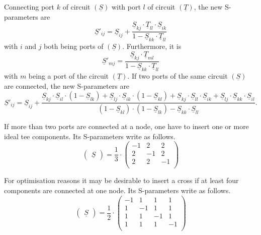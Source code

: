 Connecting port $k$ of circuit $(\underline{S})$ with port $l$ of
circuit $(\underline{T})$, the new S-parameters are
\begin{equation}
\underline{S}'_{ij} = \underline{S}_{ij} +
      \frac{\underline{S}_{kj}\cdot \underline{T}_{ll}\cdot \underline{S}_{ik}}
           {1-\underline{S}_{kk}\cdot \underline{T}_{ll}}
\label{eq:connectSij}
\end{equation}
with $i$ and $j$ both being ports of $(\underline{S})$.  Furthermore, it is
\begin{equation}
\underline{S}'_{mj} =
      \frac{\underline{S}_{kj}\cdot \underline{T}_{ml}}
           {1-\underline{S}_{kk}\cdot \underline{T}_{ll}}
\label{eq:connectSmj}
\end{equation}
with $m$ being a port of the circuit $(\underline{T})$.  If two ports
of the same circuit $(\underline{S})$ are connected, the new
S-parameters are
\begin{equation}
\underline{S}'_{ij} = \underline{S}_{ij} +
      \frac{ \underline{S}_{kj}\cdot \underline{S}_{il}\cdot (1-\underline{S}_{lk})
           + \underline{S}_{lj}\cdot \underline{S}_{ik}\cdot (1-\underline{S}_{kl})
           + \underline{S}_{kj}\cdot \underline{S}_{ll}\cdot \underline{S}_{ik}
           + \underline{S}_{lj}\cdot \underline{S}_{kk}\cdot \underline{S}_{il}}
           {(1-\underline{S}_{kl})\cdot (1-\underline{S}_{lk}) - \underline{S}_{kk}\cdot \underline{S}_{ll}}.
\label{eq:iconnectSij}
\end{equation}

If more than two ports are connected at a node, one have to insert one
or more ideal tee components.  Its S-parameters write as follows.
\begin{equation}
\begin{pmatrix}
\underline{S}
\end{pmatrix}
= \dfrac{1}{3}\cdot
\begin{pmatrix}
-1 &  2 &  2\\
 2 & -1 &  2\\
 2 &  2 & -1\\
\end{pmatrix}
\end{equation}

For optimisation reasons it may be desirable to insert a cross if at
least four components are connected at one node.  Its S-parameters
write as follows.
\begin{equation}
\begin{pmatrix}
\underline{S}
\end{pmatrix}
= \dfrac{1}{2}\cdot
\begin{pmatrix}
-1 &  1 &  1 &  1\\
 1 & -1 &  1 &  1\\
 1 &  1 & -1 &  1\\
 1 &  1 &  1 & -1\\
\end{pmatrix}
\end{equation}

